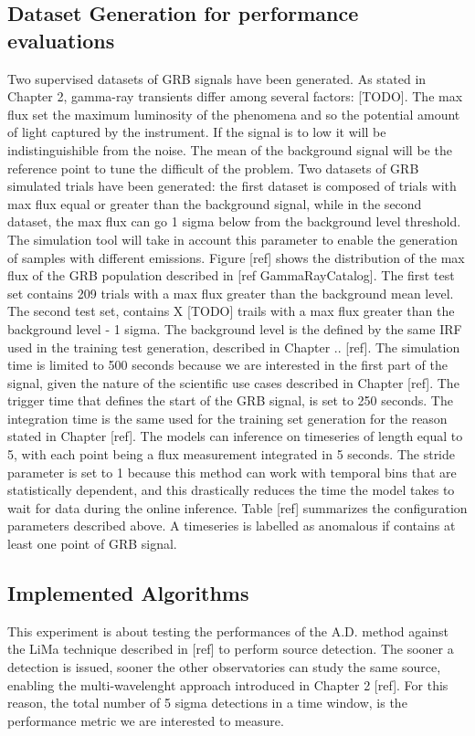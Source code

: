 \subsection{Dataset Generation for performance evaluations}
\label{s:Experiment-Data}
Two supervised datasets of GRB signals have been generated. As stated in Chapter 2, gamma-ray transients differ among several factors: [TODO]. The max flux set the maximum luminosity of the phenomena and so the potential amount of light captured by the instrument. If the signal is to low it will be indistinguishible from the noise. The mean of the background signal will be the reference point to tune the difficult of the problem. Two datasets of GRB simulated trials have been generated: the first dataset is composed of trials with max flux equal or greater than the background signal, while in the second dataset, the max flux can go 1 sigma below from the background level threshold. 
The simulation tool will take in account this parameter to enable the generation of samples with different emissions. Figure [ref] shows the distribution of the max flux of the GRB population described in [ref GammaRayCatalog]. The first test set contains 209 trials with a max flux greater than the background mean level. The second test set, contains X [TODO] trails with a max flux greater than the background level - 1 sigma. The background level is the defined by the same IRF used in the training test generation, described in Chapter .. [ref]. The simulation time is limited to 500 seconds because we are interested in the first part of the signal, given the nature of the scientific use cases described in Chapter [ref]. The trigger time that defines the start of the GRB signal, is set to 250 seconds. The integration time is the same used for the training set generation for the reason stated in Chapter [ref]. The models can inference on timeseries of length equal to 5, with each point being a flux measurement integrated in 5 seconds. The stride parameter is set to 1 because this method can work with temporal bins that are statistically dependent, and this drastically reduces the time the model takes to wait for data during the online inference. Table [ref] summarizes the configuration parameters described above.  
A timeseries is labelled as anomalous if contains at least one point of GRB signal.





\subsection{Implemented Algorithms}
\label{s:Experiment-Algo}
This experiment is about testing the performances of the A.D. method against the LiMa technique described in [ref] to perform source detection. The sooner a detection is issued, sooner the other observatories can study the same source, enabling the multi-wavelenght approach introduced in Chapter 2 [ref]. For this reason, the total number of 5 sigma detections in a time window, is the performance metric we are interested to measure.



